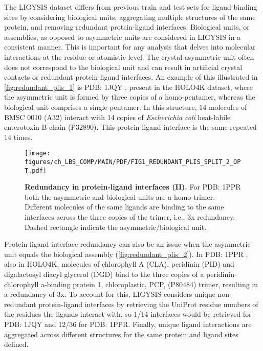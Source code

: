 The LIGYSIS dataset differs from previous train and test sets for ligand binding sites by considering biological units, aggregating multiple structures of the same protein, and removing redundant protein-ligand interfaces. Biological units, or assemblies, as opposed to asymmetric units are considered in LIGYSIS in a consistent manner. This is important for any analysis that delves into molecular interactions at the residue or atomistic level. The crystal asymmetric unit often does not correspond to the biological unit and can result in artificial crystal contacts or redundant protein-ligand interfaces. An example of this illustrated in \autoref{fig:redundant_plis_1} is PDB: 1JQY \cite{PICKENS_2002_ANCHOR}, present in the HOLO4K dataset, where the asymmetric unit is formed by three copies of a homo-pentamer, whereas the biological unit comprises a single pentamer. In this structure, 14 molecules of BMSC 0010 (A32) interact with 14 copies of \textit{Escherichia coli} heat-labile enterotoxin B chain (P32890). This protein-ligand interface is the same repeated 14 times.

\FloatBarrier

\begin{figure}[htb!]
    \centering
    \texttt{[image: figures/ch\_LBS\_COMP/MAIN/PDF/FIG1\_REDUNDANT\_PLIS\_SPLIT\_2\_OPT.pdf]}
    \caption[Redundancy in protein-ligand interfaces (II)]{\textbf{Redundancy in protein-ligand interfaces (II).} For PDB: 1PPR both the asymmetric and biological units are a homo-trimer. Different molecules of the same ligands are binding to the same interfaces across the three copies of the trimer, i.e., 3x redundancy. Dashed rectangle indicate the asymmetric/biological unit.}
    \label{fig:redundant_plis_2}
\end{figure}

Protein-ligand interface redundancy can also be an issue when the asymmetric unit equals the biological assembly (\autoref{fig:redundant_plis_2}). In PDB: 1PPR \cite{HOFMANN_1996_CAROTENOID}, also in HOLO4K, molecules of chlorophyll A (CLA), peridinin (PID) and digalactosyl diacyl glycerol (DGD) bind to the three copies of a peridinin-chlorophyll a-binding protein 1, chloroplastic, PCP, (P80484) trimer, resulting in a redundancy of 3x. To account for this, LIGYSIS considers unique non-redundant protein-ligand interfaces by retrieving the UniProt residue numbers of the residues the ligands interact with, so 1/14 interfaces would be retrieved for PDB: 1JQY and 12/36 for PDB: 1PPR. Finally, unique ligand interactions are aggregated across different structures for the same protein and ligand sites defined.

